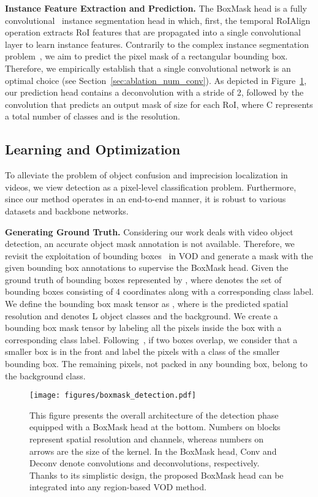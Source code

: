\documentclass[10pt,twocolumn,letterpaper]{article}
\begin{document}
\noindent \textbf{Instance Feature Extraction and Prediction.}
The BoxMask head is a fully convolutional~\cite{long2015fully} instance segmentation head in which, first, the temporal RoIAlign operation extracts  RoI features that are propagated into a single  convolutional layer to learn instance features. Contrarily to the complex instance segmentation problem~\cite{he2017mask, chen2019hybrid}, we aim to predict the pixel mask of a rectangular bounding box. Therefore, we empirically establish that a single convolutional network is an optimal choice (see Section~\ref{sec:ablation_num_conv}). As depicted in Figure~\ref{fig:boxmask_detection}, our prediction head contains a  deconvolution with a stride of 2, followed by the  convolution that predicts an output mask of size  for each RoI, where C represents a total number of classes and  is the resolution.


\subsection{Learning and Optimization}
\label{sec:boxMask_learning}
To alleviate the problem of object confusion and imprecision localization in videos, we view detection as a pixel-level classification problem. Furthermore, since our method operates in an end-to-end manner, it is robust to various datasets and backbone networks.

\vspace{3pt}
\noindent \textbf{Generating Ground Truth. }
Considering our work deals with video object detection, an accurate object mask annotation is not available. Therefore, we revisit the exploitation of bounding boxes~\cite{dai2015boxsup, bounding_box, bbox_2seg} in VOD and generate a mask with the given bounding box annotations to supervise the BoxMask head. Given the ground truth of bounding boxes represented by , where  denotes the set of bounding boxes consisting of 4 coordinates along with a corresponding class label. We define the bounding box mask tensor as , where  is the predicted spatial resolution and  denotes L object classes and the background. We create a bounding box mask tensor  by labeling all the pixels inside the box with a corresponding class label. Following~\cite{bbox_SDI, bbox_2seg}, if two boxes overlap, we consider that a smaller box is in the front and label the pixels with a class of the smaller bounding box. The remaining pixels, not packed in any bounding box, belong to the background class.

\begin{figure}
\centering
\texttt{[image: figures/boxmask\_detection.pdf]}
\caption{This figure presents the overall architecture of the detection phase equipped with a BoxMask head at the bottom. Numbers on blocks represent spatial resolution and channels, whereas numbers on arrows are the size of the kernel. In the BoxMask head, Conv and Deconv denote convolutions and deconvolutions, respectively. Thanks to its simplistic design, the proposed BoxMask head can be integrated into any region-based VOD method.}
\label{fig:boxmask_detection}
\vspace{-10pt}
\end{figure}
\end{document}
